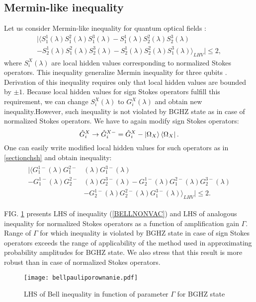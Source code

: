 \documentclass[aps,pra, twocolumn, showpacs]{revtex4-2}
\begin{document}
\subsection{Mermin-like inequality}
Let us consider Mermin-like inequality for quantum optical fields \cite{BGHZ}:
\begin{multline}
|\langle S_1^1(\lambda) S_1^2(\lambda) S_1^3(\lambda)- S_1^1(\lambda)S_2^2(\lambda) S_2^3(\lambda)\\- S_2^1(\lambda) S_1^2(\lambda) S_2^3(\lambda)- S_2^1(\lambda) S_2^2(\lambda) S_1^3(\lambda)\rangle_{LHV}|\leq 2,
\label{BELL}
\end{multline}
where $S_i^X(\lambda)$ are local hidden values corresponding to normalized Stokes operators. This inequality generalize Mermin inequality for three qubits \cite{Mermin:inequality}. Derivation of this inequality requires only that local hidden values are bounded by $\pm 1$. Because local hidden values for sign Stokes operators fulfill this requirement, we can change $S_i^X(\lambda)$ to $G_i^X(\lambda)$ and obtain new inequality.However, such inequality is not violated by BGHZ state as in case of normalized Stokes operators. We have to again modify sign Stokes operators:  
\begin{equation}
\hat G_i^X\rightarrow \hat G_i^{X-}=\hat G_i^X-\ket{\Omega_X}\bra{\Omega_X}.
\end{equation}
One can easily write modified local hidden values for such operators as in \ref{sectionchsh} and obtain inequality:
\begin{align}
\begin{split}
\label{BELLNONVAC}
|\langle G_1^{1-}(\lambda)G_1^{2-}&(\lambda)G_1^{3-}(\lambda)\\
- G_1^{1-}(\lambda)G_2^{2-}&(\lambda)G_2^{3-}(\lambda)- G_2^{1-}(\lambda)G_1^{2-}(\lambda)G_2^{3-}(\lambda)\\
&- G_2^{1-}(\lambda)G_2^{2-}(\lambda)G_1^{3-}(\lambda)\rangle_{LHV}|\leq 2.
\end{split}
\end{align}

FIG. \ref{bellghz} presents LHS of inequality (\ref{BELLNONVAC}) and LHS of analogous inequality for normalized Stokes operators as a function of amplification gain  $\Gamma$. Range of  $\Gamma$ for which inequality is violated by BGHZ state in case of sign Stokes operators  exceeds the range of applicability of the method used in approximating probability amplitudes for BGHZ state. We also stress that this result is more robust than in case of normalized Stokes operators.   
\begin{figure}[h!]
\centering
\texttt{[image: bellpauliporownanie.pdf]} 
\caption{LHS of Bell inequality in function of parameter  $\Gamma$ for BGHZ state}
\label{bellghz}
\end{figure}
\end{document}
